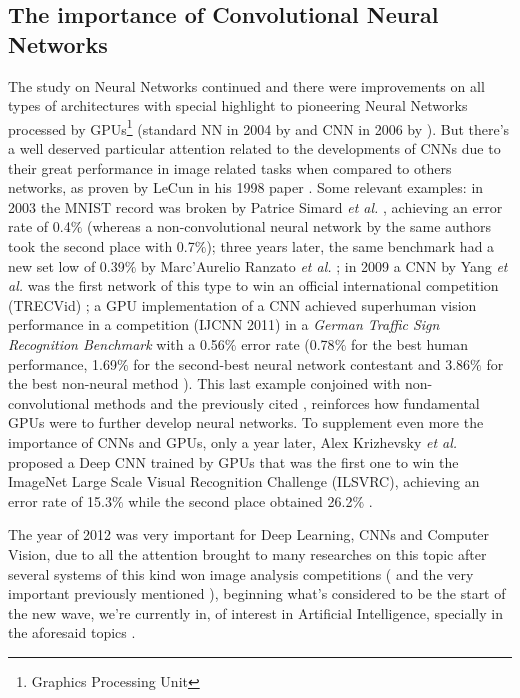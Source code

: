 \documentclass[a4paper, 12pt]{report}
\begin{document}
\subsection{The importance of Convolutional Neural Networks}
The study on Neural Networks continued and there were improvements on all types of architectures \autocite{hochreiterLongShortTermMemory1997,wengCresceptronSelforganizingNeural1992} with special highlight to pioneering Neural Networks processed by GPUs\footnote{Graphics Processing Unit} (standard NN in 2004 by \autocite{ohGPUImplementationNeural2004} and CNN in 2006 by \autocite{chellapillaHighPerformanceConvolutional}). But there's a well deserved particular attention related to the developments of CNNs due to their great performance in image related tasks when compared to others networks, as proven by LeCun in his 1998 paper \autocite{lecunGradientBasedLearningApplied1998}. Some relevant examples: in 2003 the MNIST record was broken by Patrice Simard \textit{et al.} \autocite{simardBestPracticesConvolutional2003}, achieving an error rate of 0.4$\%$ (whereas a non-convolutional neural network by the same authors took the second place with 0.7$\%$); three years later, the same benchmark had a new set low of 0.39$\%$ by Marc’Aurelio Ranzato \textit{et al.} \autocite{ranzatoEfficientLearningSparse2006}; in 2009 a CNN by Yang \textit{et al.} was the first network of this type to win an official international competition (TRECVid) \autocite{Yang2009}; a GPU implementation of a CNN \autocite{ciresanCommitteeNeuralNetworks2011} achieved superhuman vision performance in a competition (IJCNN 2011) in a \textit{German Traffic Sign Recognition Benchmark} with a 0.56$\%$ error rate (0.78$\%$ for the best human performance, 1.69$\%$ for the second-best neural network contestant and 3.86$\%$ for the best non-neural method \autocite{stallkampManVsComputer2012}). This last example conjoined with non-convolutional methods \autocite{rainaLargescaleDeepUnsupervised2009b,ciresanDeepBigSimple2010} and the previously cited \autocite{chellapillaHighPerformanceConvolutional,ohGPUImplementationNeural2004}, reinforces how fundamental GPUs were to further develop neural networks. To supplement even more the importance of CNNs and GPUs, only a year later, Alex Krizhevsky \textit{et al.} proposed a Deep CNN trained by GPUs that was the first one to win the ImageNet Large Scale Visual Recognition Challenge (ILSVRC), achieving an error rate of 15.3$\%$ while the second place obtained 26.2$\%$ \autocite{krizhevskyImageNetClassificationDeep2012}. 
\par The year of 2012 was very important for Deep Learning, CNNs and Computer Vision, due to all the attention brought to many researches on this topic after several systems of this kind won image analysis competitions (\autocite{ciresanDeepNeuralNetworks2012,ciresanMitosisDetectionBreast2013} and the very important previously mentioned \autocite{krizhevskyImageNetClassificationDeep2012}), beginning what's considered to be the start of the new wave, we're currently in, of interest in Artificial Intelligence, specially in the aforesaid topics \autocite{liSurveyConvolutionalNeural2020}. 
\end{document}
